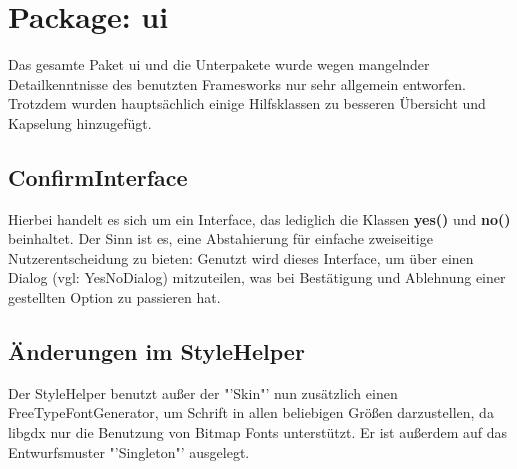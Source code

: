 \section{Package: ui}

Das gesamte Paket ui und die Unterpakete wurde wegen mangelnder Detailkenntnisse des benutzten Framesworks nur sehr allgemein entworfen. Trotzdem wurden hauptsächlich einige Hilfsklassen zu besseren Übersicht und Kapselung hinzugefügt.

\subsection{ConfirmInterface}
Hierbei handelt es sich um ein Interface, das lediglich die Klassen \textbf{yes()} und \textbf{no()} beinhaltet. Der Sinn ist es, eine Abstahierung für einfache zweiseitige Nutzerentscheidung zu bieten: Genutzt wird dieses Interface, um über einen Dialog (vgl: YesNoDialog) mitzuteilen, was bei Bestätigung und Ablehnung einer gestellten Option zu passieren hat.

\subsection{Änderungen im StyleHelper}
Der StyleHelper benutzt außer der "'Skin"' nun zusätzlich einen FreeTypeFontGenerator, um Schrift in allen beliebigen Größen darzustellen, da libgdx nur die Benutzung von Bitmap Fonts unterstützt. Er ist außerdem auf das Entwurfsmuster "'Singleton"' ausgelegt.

